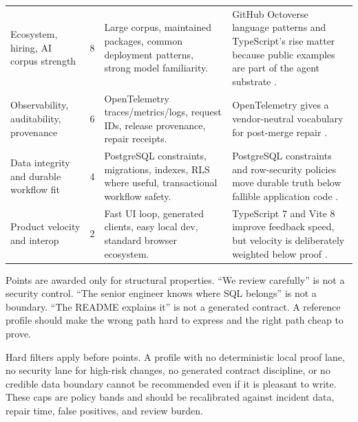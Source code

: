 \begin{table}[t]
\begin{tabularx}{\textwidth}{L{0.21\textwidth} L{0.07\textwidth} Y Y}
Ecosystem, hiring, AI corpus strength & 8 & Large corpus, maintained packages, common deployment patterns, strong model familiarity. & GitHub Octoverse language patterns and TypeScript's rise matter because public examples are part of the agent substrate \cite{githubOctoverse2025}. \\
Observability, auditability, provenance & 6 & OpenTelemetry traces/metrics/logs, request IDs, release provenance, repair receipts. & OpenTelemetry gives a vendor-neutral vocabulary for post-merge repair \cite{openTelemetryDocs2025,otelSemanticConventions2026}. \\
Data integrity and durable workflow fit & 4 & PostgreSQL constraints, migrations, indexes, RLS where useful, transactional workflow safety. & PostgreSQL constraints and row-security policies move durable truth below fallible application code \cite{postgresConstraints2026,postgresRowSecurity2026}. \\
Product velocity and interop & 2 & Fast UI loop, generated clients, easy local dev, standard browser ecosystem. & TypeScript 7 and Vite 8 improve feedback speed, but velocity is deliberately weighted below proof \cite{typescript70Beta2026,vite80Release2026}. \\
\bottomrule
\end{tabularx}
\end{table}

Points are awarded only for structural properties. ``We review carefully'' is not a security control. ``The senior engineer knows where SQL belongs'' is not a boundary. ``The README explains it'' is not a generated contract. A reference profile should make the wrong path hard to express and the right path cheap to prove.

Hard filters apply before points. A profile with no deterministic local proof lane, no security lane for high-risk changes, no generated contract discipline, or no credible data boundary cannot be recommended even if it is pleasant to write. These caps are policy bands and should be recalibrated against incident data, repair time, false positives, and review burden.

